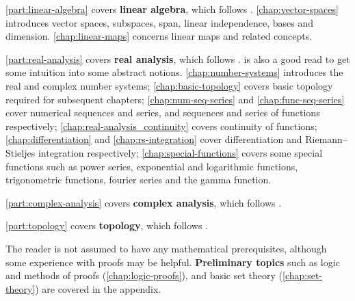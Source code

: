 \iflinalg
\cref{part:linear-algebra} covers \textbf{linear algebra}, which follows \cite{axler}. \cref{chap:vector-spaces} introduces vector spaces, subspaces, span, linear independence, bases and dimension. \cref{chap:linear-maps} concerns linear maps and related concepts.
\fi

\ifranalysis
\cref{part:real-analysis} covers \textbf{real analysis}, which follows \cite{rudin,apostol,bartle-sherbert}. \cite{alcock} is also a good read to get some intuition into some abstract notions. \cref{chap:number-systems} introduces the real and complex number systems; \cref{chap:basic-topology} covers basic topology required for subsequent chapters; \cref{chap:num-seq-series} and \cref{chap:func-seq-series} cover numerical sequences and series, and sequences and series of functions respectively; \cref{chap:real-analysis_continuity} covers continuity of functions; \cref{chap:differentiation} and \cref{chap:rs-integration} cover differentiation and Riemann--Stieljes integration respectively; \cref{chap:special-functions} covers some special functions such as power series, exponential and logarithmic functions, trigonometric functions, fourier series and the gamma function.
\fi

\ifcanalysis
\cref{part:complex-analysis} covers \textbf{complex analysis}, which follows \cite{ahlfors,lang}.
\fi

\iftop
\cref{part:topology} covers \textbf{topology}, which follows \cite{munkres}.
\fi

\ifprelim
The reader is not assumed to have any mathematical prerequisites, although some experience with proofs may be helpful. \textbf{Preliminary topics} such as logic and methods of proofs (\cref{chap:logic-proofs}), and basic set theory (\cref{chap:set-theory}) are covered in the appendix.
\fi

